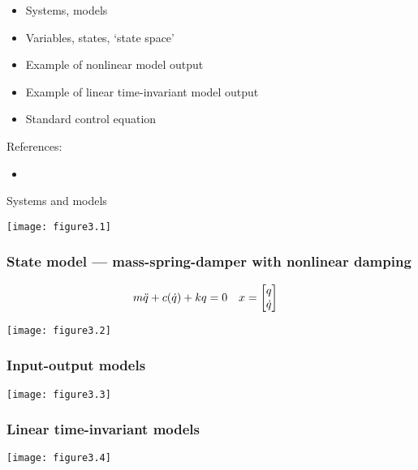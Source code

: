 \documentclass{beamer-control}
\begin{document}

\begin{SUMMARY}
\begin{itemize}
\item Systems, models
\item Variables, states, `state space'
\item Example of nonlinear model output
\item Example of linear time-invariant model output
\item Standard control equation
\end{itemize}
\vfill References:
\begin{itemize}
\item {}
\end{itemize}
\end{SUMMARY}


\begin{frame}{Systems and models}

\texttt{[image: figure3.1]}

\end{frame}

\begin{frame}
\frametitle{State model --- mass-spring-damper with nonlinear damping}

\vspace*{-5mm}
\begin{align}
m \ddot q + c(\dot q) + kq &= 0 & x &= \begin{bmatrix}q\\ \dot q\end{bmatrix}
\end{align}

\centering
\texttt{[image: figure3.2]}

\end{frame}

\begin{frame}
\frametitle{Input-output models}
\texttt{[image: figure3.3]}
\end{frame}

\begin{frame}
\frametitle{Linear time-invariant models}
\texttt{[image: figure3.4]}
\end{frame}
\end{document}
